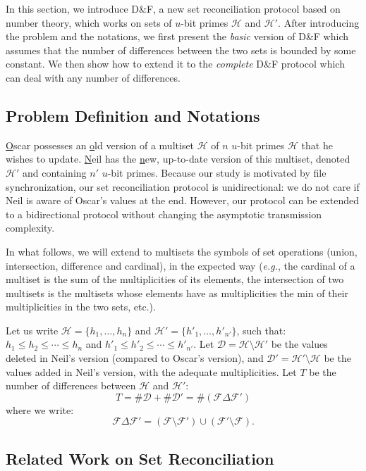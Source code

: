 \documentclass{llncs}
\newcommand{\Set}{\mathcal{H}}
\newcommand{\SetD}{\mathcal{D}}
\newcommand{\Files}{\mathcal{F}}
\newcommand{\df}{D\&F\xspace}
\newcommand{\eg}{\textit{e.g.}\xspace}
\newcommand{\comm}[1]{\todo{#1}}
\begin{document}
In this section, we introduce \df, a new set reconciliation protocol based on number theory, which works on sets of $u$-bit primes $\Set$ and $\Set'$.
After introducing the problem and the notations, we first present the \emph{basic} version of \df which assumes that the number of differences between the two sets is bounded by some constant.
We then show how to extend it to the \emph{complete} \df protocol which can deal with any number of differences.

\subsection{Problem Definition and Notations}

\underline{O}scar possesses an \underline{o}ld version of a multiset $\Set$ of $n$ $u$-bit primes $\Set$ that he wishes to update.
\underline{N}eil has the \underline{n}ew, up-to-date version of this multiset, denoted $\Set'$ and containing $n'$ $u$-bit primes.
Because our study is motivated by file synchronization, our set reconciliation protocol is unidirectional: we do not care if Neil is aware of Oscar's values at the end. However, our protocol can be extended to a bidirectional protocol without changing the asymptotic transmission complexity.

In what follows, we will extend to multisets the symbols of set operations (union, intersection, difference and cardinal), in the expected way (\eg, the cardinal of a multiset is the sum of the multiplicities of its elements, the intersection of two multisets is the multisets whose elements have as multiplicities the min of their multiplicities in the two sets, etc.).

Let us write $\Set = \{h_1,\dots,h_n\}$ and $\Set' = \{h'_1,\dots,h'_{n'}\}$, such that: $h_1 \leq h_2 \leq \cdots \leq h_n$ and $h'_1 \leq h'_2 \leq \cdots \leq h'_{n'}$.
Let $\SetD = \Set \setminus \Set'$ be the values deleted in Neil's version (compared to Oscar's version), and $\SetD' = \Set' \setminus \Set$ be the values added in Neil's version, with the adequate multiplicities.
Let $T$ be the number of differences between $\Set$ and $\Set'$:
\[ T = \# \SetD + \# \SetD' = \# \left( \Files \Delta \Files' \right) \]
where we write:
\[ \Files \Delta \Files' = (\Files \setminus \Files') \cup (\Files' \setminus \Files). \]

\subsection{Related Work on Set Reconciliation}\label{sec:related-work}
\end{document}
